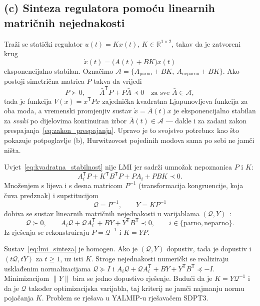 \subsection{(c) Sinteza regulatora pomoću linearnih matričnih nejednakosti}

Traži se statički regulator $u(t) = Kx(t)$, $K \in \mathbb{R}^{1 \times 2}$, takav da je zatvoreni krug
\begin{equation}
\dot{x}(t) = \big(A(t) + BK\big) x(t)
\label{eq:zatvoreni_krug}
\end{equation}
eksponencijalno stabilan. Označimo $\mathcal{A} = \{A_{\mathrm{parno}} + BK, \ A_{\mathrm{neparno}} + BK\}$. Ako postoji simetrična matrica $P$ takva da vrijedi~\cite[str.~25--26]{jokic2025stabilnost}
\begin{equation}
P \succ 0, \qquad \bar{A}^{\mathsf{T}} P + P \bar{A} \prec 0 \quad \text{za sve } \bar{A} \in \mathcal{A},
\label{eq:kvadratna_stabilnost}
\end{equation}
tada je funkcija $V(x) = x^{\mathsf{T}} P x$ zajednička kvadratna Ljapunovljeva funkcija za oba moda, a vremenski promjenjiv sustav $\dot{x} = \bar{A}(t) x$ je eksponencijalno stabilan za \emph{svaki} po dijelovima kontinuiran izbor $\bar{A}(t) \in \mathcal{A}$ --- dakle i za zadani zakon prespajanja~\eqref{eq:zakon_prespajanja}. Upravo je to svojstvo potrebno: kao što pokazuje potpoglavlje (b), Hurwitzovost pojedinih modova sama po sebi ne jamči ništa.

Uvjet~\eqref{eq:kvadratna_stabilnost} nije LMI jer sadrži umnožak nepoznanica $P$ i $K$:
\begin{equation}
A_i^{\mathsf{T}} P + K^{\mathsf{T}} B^{\mathsf{T}} P + P A_i + P B K \prec 0 .
\end{equation}
Množenjem s lijeva i s desna matricom $P^{-1}$ (transformacija kongruencije, koja čuva predznak) i supstitucijom
\begin{equation}
\mathcal{Q} = P^{-1}, \qquad Y = K P^{-1}
\end{equation}
dobiva se sustav linearnih matričnih nejednakosti u varijablama $(\mathcal{Q}, Y)$~\cite[str.~32--33]{jokic2025stabilnost}:
\begin{equation}
\mathcal{Q} \succ 0, \qquad
A_i \mathcal{Q} + \mathcal{Q} A_i^{\mathsf{T}} + B Y + Y^{\mathsf{T}} B^{\mathsf{T}} \prec 0,
\qquad i \in \{\mathrm{parno}, \mathrm{neparno}\}.
\label{eq:lmi_sinteza}
\end{equation}
Iz rješenja se rekonstruiraju $P = \mathcal{Q}^{-1}$ i $K = Y P$.

Sustav~\eqref{eq:lmi_sinteza} je homogen. Ako je $(\mathcal{Q}, Y)$ dopustiv, tada je dopustiv i $(t\mathcal{Q}, tY)$ za $t \geq 1$, uz isti $K$. Stroge nejednakosti numerički se realiziraju usklađenim normalizacijama $\mathcal{Q} \succeq I$ i $A_i \mathcal{Q} + \mathcal{Q} A_i^{\mathsf{T}} + BY + Y^{\mathsf{T}}B^{\mathsf{T}} \preceq -I$. Minimizacijom $\|Y\|$ bira se jedno dopustivo rješenje. Budući da je $K=Y\mathcal{Q}^{-1}$ i da je $\mathcal{Q}$ također optimizacijska varijabla, taj kriterij ne jamči najmanju normu pojačanja $K$. Problem se rješava u YALMIP-u rješavačem SDPT3.

